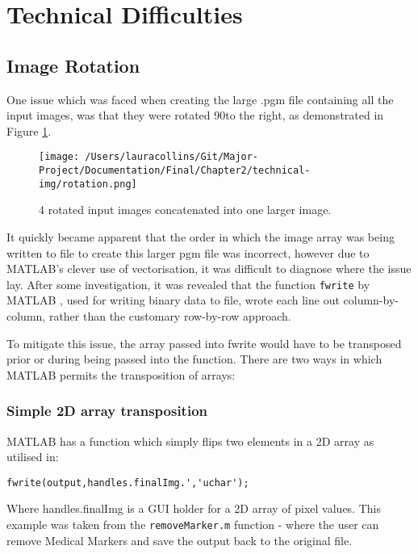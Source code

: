 \section{Technical Difficulties}

\subsection{Image Rotation}
\label{ssec:trans}

One issue which was faced when creating the large .pgm file containing all the input images, was that they were rotated 90\degree to the right, as demonstrated in Figure \ref{fig:rotated-input}.

\begin{figure}[H]
  \centering
  \texttt{[image: /Users/lauracollins/Git/Major-Project/Documentation/Final/Chapter2/technical-img/rotation.png]}
  \caption{4 rotated input images concatenated into one larger image.}
  \label{fig:rotated-input}
\end{figure}

It quickly became apparent that the order in which the image array was being written to file to create this larger pgm file was incorrect, however due to MATLAB's clever use of vectorisation, it was difficult to diagnose where the issue lay. After some investigation, it was revealed that the function \texttt{fwrite} by MATLAB \cite{fwrite}, used for writing binary data to file, wrote each line out column-by-column, rather than the customary row-by-row approach.

To mitigate this issue, the array passed into fwrite would have to be transposed prior or during being passed into the function. There are two ways in which MATLAB permits the \gls{transposition} of arrays:

\subsubsection{Simple 2D array transposition}

MATLAB has a  function which simply flips two elements in a 2D array as utilised in:

\begin{lstlisting}[style=Matlab-editor,frame=single]
    fwrite(output,handles.finalImg.','uchar');
\end{lstlisting}

Where handles.finalImg is a GUI holder for a 2D array of pixel values. This example was taken from the \texttt{removeMarker.m}  function - where the user can remove Medical Markers and save the output back to the original file.

